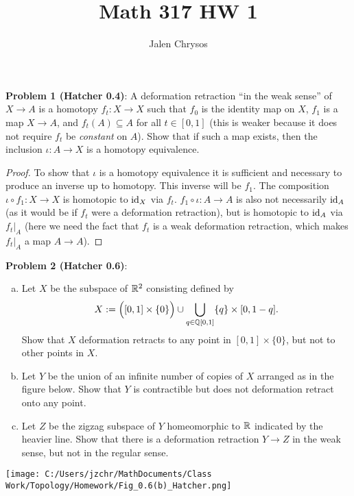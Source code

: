 \documentclass{amsart}
\title{Math 317 HW 1}
\author{Jalen Chrysos}
\begin{document}
	
	\maketitle

\noindent \textbf{Problem 1 (Hatcher 0.4)}: A deformation retraction ``in the weak sense'' of $X\to A$ is a homotopy $f_t:X\to X$ such that $f_0$ is the identity map on $X$, $f_1$ is a map $X\to A$, and $f_t(A)\subseteq A$ for all $t\in [0,1]$ (this is weaker because it does not require $f_t$ be \textit{constant} on $A$). Show that if such a map exists, then the inclusion $\iota:A\to X$ is a homotopy equivalence.

\begin{proof}
	To show that $\iota$ is a homotopy equivalence it is sufficient and necessary to produce an inverse up to homotopy. This inverse will be $f_1$. The composition $\iota \circ f_1:X\to X$ is homotopic to $\operatorname{id}_X$ via $f_t$. $f_1\circ \iota:A\to A$ is also not necessarily $\operatorname{id}_A$ (as it would be if $f_t$ were a deformation retraction), but is homotopic to $\operatorname{id}_A$ via $f_t|_A$ (here we need the fact that $f_t$ is a weak deformation retraction, which makes $f_t|_A$ a map $A\to A$).
\end{proof}

\newpage 


\noindent \textbf{Problem 2 (Hatcher 0.6)}: 
\begin{enumerate}[(a)]
	\item Let $X$ be the subspace of $\mathbb{R}^2$ consisting defined by
	$$
	X := \Big([0,1]\times \{0\} \Big) \cup \bigcup_{q\in \mathbb{Q}[0,1]} \{q\}\times [0,1-q].
	$$
	Show that $X$ deformation retracts to any point in $[0,1]\times \{0\}$, but not to other points in $X$.
	\item Let $Y$ be the union of an infinite number of copies of $X$ arranged as in the figure below. Show that $Y$ is contractible but does not deformation retract onto any point.
	\item Let $Z$ be the zigzag subspace of $Y$ homeomorphic to $\mathbb{R}$ indicated by the heavier line. Show that there is a deformation retraction $Y\to Z$ in the weak sense, but not in the regular sense.
\end{enumerate}

\texttt{[image: C:/Users/jzchr/MathDocuments/Class Work/Topology/Homework/Fig\_0.6(b)\_Hatcher.png]}
\end{document}
